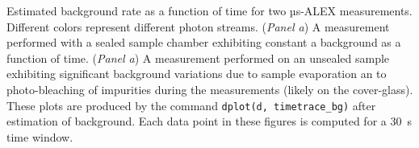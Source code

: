 \label{fig:bg_timetrace} Estimated background rate as a function of time for two µs-ALEX measurements. Different colors represent different photon streams. (\textit{Panel a}) A measurement performed with a sealed sample chamber exhibiting constant a background as a function of time. (\textit{Panel a}) A measurement performed on an unsealed sample exhibiting significant background variations due to sample evaporation an to photo-bleaching of impurities during the measurements (likely on the cover-glass). 
These plots are produced by the command
\texttt{dplot(d, timetrace\_bg)} after estimation of background. 
Each data point in these figures is computed for a 30~s time window.